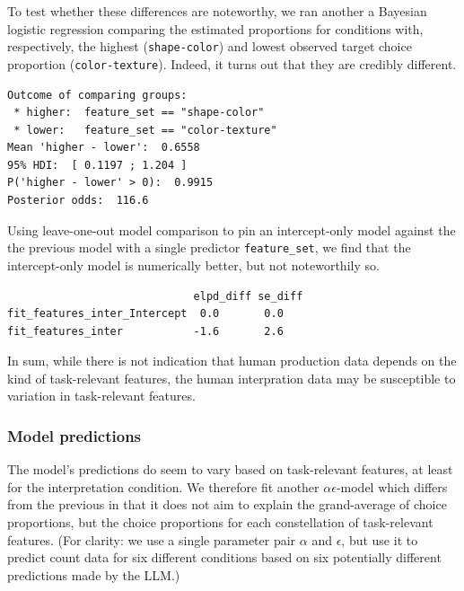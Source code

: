 \documentclass{article}
\begin{document}
To test whether these differences are noteworthy, we ran another a
Bayesian logistic regression comparing the estimated proportions for
conditions with, respectively, the highest (\texttt{shape-color}) and
lowest observed target choice proportion (\texttt{color-texture}).
Indeed, it turns out that they are credibly different.

\begin{verbatim}
Outcome of comparing groups:
 * higher:  feature_set == "shape-color"
 * lower:   feature_set == "color-texture"
Mean 'higher - lower':  0.6558
95% HDI:  [ 0.1197 ; 1.204 ]
P('higher - lower' > 0):  0.9915
Posterior odds:  116.6
\end{verbatim}

Using leave-one-out model comparison to pin an intercept-only model
against the the previous model with a single predictor
\texttt{feature\_set}, we find that the intercept-only model is
numerically better, but not noteworthily so.

\begin{verbatim}
                             elpd_diff se_diff
fit_features_inter_Intercept  0.0       0.0
fit_features_inter           -1.6       2.6
\end{verbatim}

In sum, while there is not indication that human production data depends
on the kind of task-relevant features, the human interpration data may
be susceptible to variation in task-relevant features.

\hypertarget{model-predictions}{%
\subsubsection{Model predictions}\label{model-predictions}}

The model's predictions do seem to vary based on task-relevant features,
at least for the interpretation condition. We therefore fit another
\(\alpha\epsilon\)-model which differs from the previous in that it does
not aim to explain the grand-average of choice proportions, but the
choice proportions for each constellation of task-relevant features.
(For clarity: we use a single parameter pair \(\alpha\) and
\(\epsilon\), but use it to predict count data for six different
conditions based on six potentially different predictions made by the
LLM.) 
\end{document}
